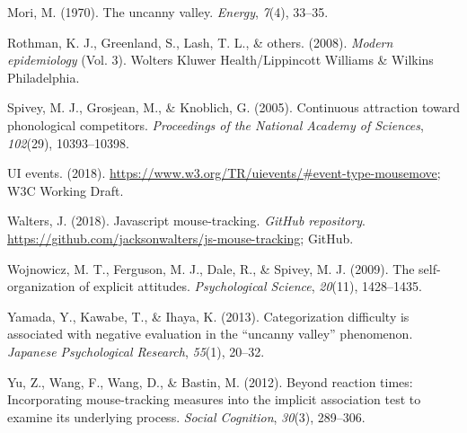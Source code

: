 \documentclass[]{article}
\begin{document}
\hypertarget{ref-mori}{}
Mori, M. (1970). The uncanny valley. \emph{Energy}, \emph{7}(4), 33--35.

\hypertarget{ref-rothman}{}
Rothman, K. J., Greenland, S., Lash, T. L., \& others. (2008).
\emph{Modern epidemiology} (Vol. 3). Wolters Kluwer Health/Lippincott
Williams \& Wilkins Philadelphia.

\hypertarget{ref-spivey}{}
Spivey, M. J., Grosjean, M., \& Knoblich, G. (2005). Continuous
attraction toward phonological competitors. \emph{Proceedings of the
National Academy of Sciences}, \emph{102}(29), 10393--10398.

\hypertarget{ref-mousemove}{}
UI events. (2018).
\url{https://www.w3.org/TR/uievents/\#event-type-mousemove}; W3C Working
Draft.

\hypertarget{ref-jackson_git}{}
Walters, J. (2018). Javascript mouse-tracking. \emph{GitHub repository}.
\url{https://github.com/jacksonwalters/js-mouse-tracking}; GitHub.

\hypertarget{ref-wojnowicz}{}
Wojnowicz, M. T., Ferguson, M. J., Dale, R., \& Spivey, M. J. (2009).
The self-organization of explicit attitudes. \emph{Psychological
Science}, \emph{20}(11), 1428--1435.

\hypertarget{ref-yamada}{}
Yamada, Y., Kawabe, T., \& Ihaya, K. (2013). Categorization difficulty
is associated with negative evaluation in the ``uncanny valley''
phenomenon. \emph{Japanese Psychological Research}, \emph{55}(1),
20--32.

\hypertarget{ref-yu}{}
Yu, Z., Wang, F., Wang, D., \& Bastin, M. (2012). Beyond reaction times:
Incorporating mouse-tracking measures into the implicit association test
to examine its underlying process. \emph{Social Cognition},
\emph{30}(3), 289--306.
\end{document}
